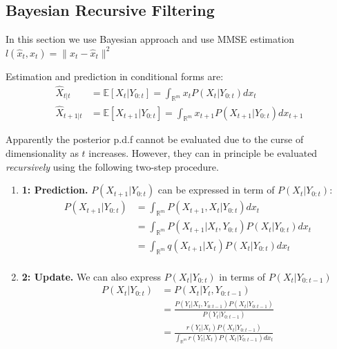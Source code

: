 \documentclass[11pt]{elegantbook}
\begin{document}
\subsection{Bayesian Recursive Filtering}
In this section we use Bayesian approach and use MMSE estimation $l(\hat{x}_t,x_t)=\|x_t-\hat{x}_t\|^2$

Estimation and prediction in conditional forms are:
\begin{equation}
    \begin{aligned}
        \hat{X}_{t|t}&=\mathbb{E}[X_{t}|Y_{0:t}]=\int_{\mathbb{R}^m}x_{t}P(X_{t}|Y_{0:t})dx_{t}\\
        \hat{X}_{t+1|t}&=\mathbb{E}[X_{t+1}|Y_{0:t}]=\int_{\mathbb{R}^m}x_{t+1}P(X_{t+1}|Y_{0:t})dx_{t+1}
    \end{aligned}
    \nonumber
\end{equation}

Apparently the posterior p.d.f cannot be evaluated due to the curse of dimensionality as $t$ increases. However, they can in principle be evaluated \textit{recursively} using the following two-step procedure.

\begin{enumerate}
    \item \textbf{ 1: Prediction.} $P(X_{t+1}|Y_{0:t})$ can be expressed in term of $P(X_t|Y_{0:t})$:
    \begin{equation}
        \begin{aligned}
            P(X_{t+1}|Y_{0:t})&=\int_{\mathbb{R}^m}P(X_{t+1},X_t|Y_{0:t})dx_t\\
            &=\int_{\mathbb{R}^m}P(X_{t+1}|X_t, Y_{0:t})P(X_t|Y_{0:t})dx_t\\
            &=\int_{\mathbb{R}^m}q(X_{t+1}|X_t)P(X_t|Y_{0:t})dx_t\\
        \end{aligned}
        \nonumber
    \end{equation}
    \item \textbf{ 2: Update.} We can also express $P(X_t|Y_{0:t})$ in terms of $P(X_t|Y_{0:t-1})$
    \begin{equation}
        \begin{aligned}
            P(X_{t}|Y_{0:t})&=P(X_t|Y_{t},Y_{0:t-1})\\
            &=\frac{P(Y_t|X_t,Y_{0:t-1})P(X_t|Y_{0:t-1})}{P(Y_t|Y_{0:t-1})}\\
            &=\frac{r(Y_t|X_t)P(X_t|Y_{0:t-1})}{\int_{\mathbb{R}^m}r(Y_t|X_t)P(X_t|Y_{0:t-1})dx_t}
        \end{aligned}
        \nonumber
    \end{equation}
\end{enumerate}
\end{document}
